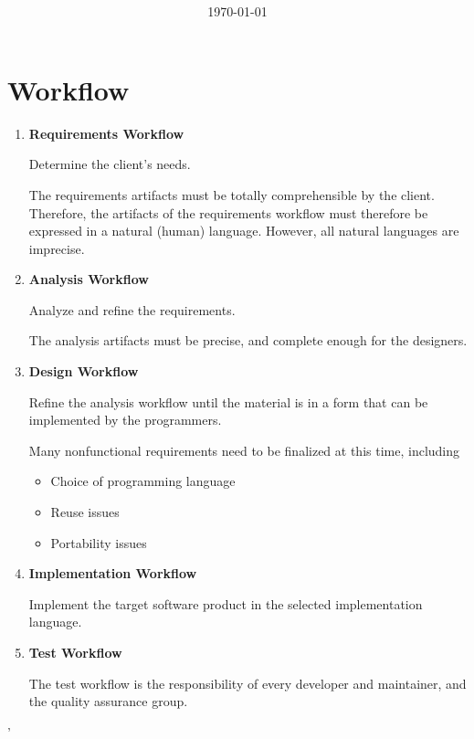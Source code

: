 \documentclass[11pt]{article}
\title{\textbf{\Topic}}
\author{\Name}
\date{\today}
\begin{document}
\maketitle
\noindent\makebox[\linewidth]{\rule[8pt]{5in}{0.5pt}}

\section*{Workflow}

\begin{enumerate}
	\item \textbf{Requirements Workflow}
	
	Determine the client’s needs.
	
	The requirements artifacts must be totally comprehensible by the client. Therefore, the artifacts of the requirements workflow must therefore be expressed in a natural (human) language. However, all natural languages are imprecise.
	
	\item \textbf{Analysis Workflow}
	
	Analyze and refine the requirements. 
	
	The analysis artifacts must be precise, and complete enough for the designers.
	
	\item \textbf{Design Workflow}
	
	Refine the analysis workflow until the material is in a form that can be implemented by the programmers.
	
	Many nonfunctional requirements need to be finalized at this time, including
	
	\begin{itemize}
		\item  Choice of programming language
		\item Reuse issues
		\item Portability issues
	\end{itemize}
	
	\item \textbf{Implementation Workflow}
	
	Implement the target software product in the selected implementation language.
	
	\item \textbf{Test Workflow}
	
	The test workflow is the responsibility of every developer and maintainer, and the quality assurance group.
	
\end{enumerate}'
\end{document}
